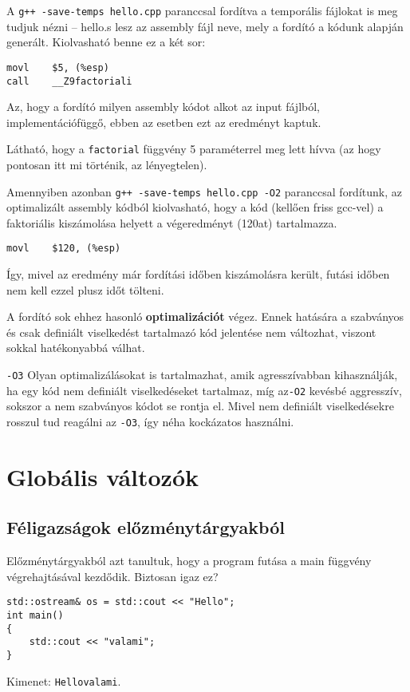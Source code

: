 \documentclass[a4paper,11.5pt,table]{article}
\begin{document}
	A \texttt{g++ -save-temps hello.cpp} paranccsal fordítva a temporális fájlokat is meg tudjuk nézni -- hello.s lesz az assembly fájl neve, mely a fordító a kódunk alapján generált. Kiolvasható benne ez a két sor:
	\begin{lstlisting}[style = customasm]
movl 	$5, (%esp)
call	__Z9factoriali
	\end{lstlisting}
	\begin{note}
		Az, hogy a fordító milyen assembly kódot alkot az input fájlból, implementációfüggő, ebben az esetben ezt az eredményt kaptuk.
	\end{note}
	Látható, hogy a \texttt{factorial} függvény 5 paraméterrel meg lett hívva (az hogy pontosan itt mi történik, az lényegtelen).
	
	\medskip
	Amennyiben azonban \texttt{g++ -save-temps hello.cpp -O2} paranccsal fordítunk, az optimalizált assembly kódból kiolvasható, hogy a kód (kellően friss gcc-vel) a faktoriális kiszámolása helyett a végeredményt (120at) tartalmazza. 
	\begin{lstlisting}[style = customasm]
movl	$120, (%esp)
	\end{lstlisting}
	Így, mivel az eredmény már fordítási időben kiszámolásra került, futási időben nem kell ezzel plusz időt tölteni.
	
	A fordító sok ehhez hasonló \textbf{optimalizációt} végez. Ennek hatására a szabványos és csak definiált viselkedést tartalmazó kód jelentése nem változhat, viszont sokkal hatékonyabbá válhat.
	\begin{note}
		\texttt{-O3} Olyan optimalizálásokat is tartalmazhat, amik agresszívabban kihasználják, ha egy kód nem definiált viselkedéseket tartalmaz, míg az\texttt{-O2} kevésbé aggresszív, sokszor a nem szabványos kódot se rontja el. Mivel nem definiált viselkedésekre rosszul tud reagálni az \texttt{-O3}, így néha kockázatos használni.
	\end{note}
	\section{Globális változók}
	\subsection{Féligazságok előzménytárgyakból}
	Előzménytárgyakból azt tanultuk, hogy a program futása a main függvény végrehajtásával kezdődik. Biztosan igaz ez?
	\begin{lstlisting}
std::ostream& os = std::cout << "Hello";
int main()
{
	std::cout << "valami";
}
	\end{lstlisting}
	Kimenet: \texttt{Hellovalami}.
	\medskip
	
\end{document}
